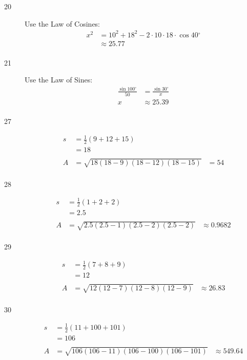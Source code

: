 \documentclass{exam}
\newcommand{\dg}{\ensuremath{^\circ}}
\begin{document}
\begin{description}
      \item[20]
        Use the Law of Cosines:
        \begin{align*}
          x^2 & = 10^2 + 18^2 - 2 \cdot 10 \cdot 18 \cdot \cos 40 \dg \\
              & \approx \boxed{ 25.77 } \\
        \end{align*}

      \item[21]
        Use the Law of Sines:
        \begin{align*}
          \frac{\sin 100 \dg}{50} & = \frac{\sin 30 \dg}{x} \\
          x                       & \approx \boxed{ 25.39 } \\
        \end{align*}

      \item[27]
        \begin{align*}
          s  & = \frac{1}{2}(9 + 12 + 15) \\
             & = 18 \\
          \\
          A  & = \sqrt{18 (18 - 9)(18 - 12) (18 - 15)}
             & = 54 \\
        \end{align*}

      \item[28]
        \begin{align*}
          s  & = \frac{1}{2}(1 + 2 + 2) \\
             & = 2.5 \\
          \\
          A  & = \sqrt{2.5 (2.5 - 1)(2.5 - 2) (2.5 - 2)}
             & \approx \boxed{ 0.9682 } \\
        \end{align*}

      \item[29]
        \begin{align*}
          s  & = \frac{1}{2}(7 + 8 + 9) \\
             & = 12 \\
          \\
          A  & = \sqrt{12 (12 - 7)(12 - 8) (12 - 9)}
             & \approx \boxed{ 26.83 } \\
        \end{align*}

      \item[30]
        \begin{align*}
          s  & = \frac{1}{2}(11 + 100 + 101) \\
             & = 106 \\
          \\
          A  & = \sqrt{106 (106 - 11)(106 - 100) (106 - 101)}
             & \approx \boxed{ 549.64 } \\
        \end{align*}


\end{description}
\end{document}
